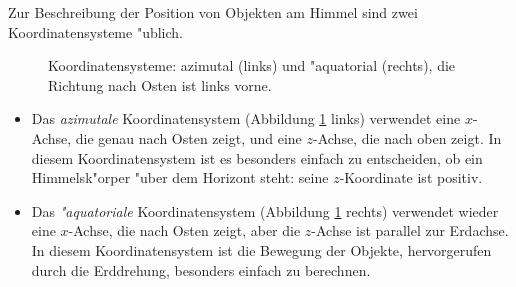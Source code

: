 Zur Beschreibung der Position von Objekten am Himmel sind zwei
Koordinatensysteme "ublich.
\begin{figure}[ht]
\begin{center}
\quad
\quad
{}
\end{center}
\caption{Koordinatensysteme: azimutal (links) und "aquatorial (rechts),
die Richtung nach Osten ist links vorne.
\label{40000029:coord}}
\end{figure}
\begin{itemize}
\item
Das {\it azimutale} Koordinatensystem
(Abbildung \ref{40000029:coord} links)
verwendet eine $x$-Achse, die genau nach Osten zeigt, und eine $z$-Achse,
die nach oben zeigt.
In diesem Koordinatensystem ist es besonders einfach zu entscheiden, ob
ein Himmelsk"orper "uber dem Horizont steht: seine $z$-Koordinate ist
positiv.
\item
Das {\it "aquatoriale} Koordinatensystem
(Abbildung \ref{40000029:coord} rechts)
verwendet wieder eine $x$-Achse,
die nach Osten zeigt, aber die $z$-Achse ist parallel zur Erdachse.
In diesem Koordinatensystem ist die Bewegung der Objekte, hervorgerufen
durch die Erddrehung, besonders einfach zu berechnen.
\end{itemize}
